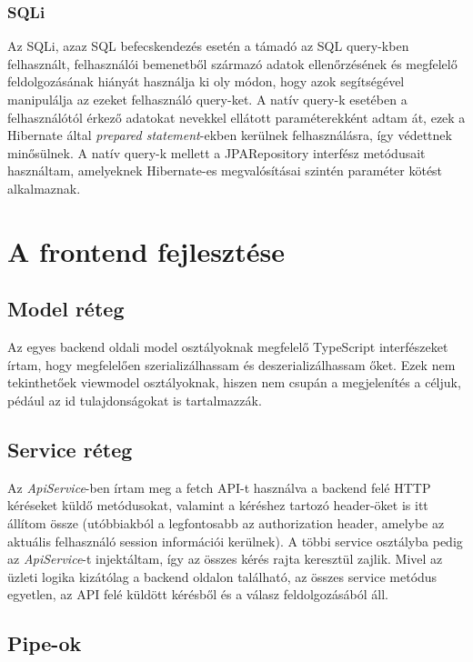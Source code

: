 \documentclass[a4paper,12pt]{report}
\theoremstyle{definition}
\theoremstyle{remark}
\begin{document}
	\subsection{SQLi}

Az SQLi\cite{Infbiztwebsite2}, azaz SQL befecskendezés esetén a támadó az SQL query-kben felhasznált, felhasználói bemenetből származó adatok ellenőrzésének és megfelelő feldolgozásának hiányát használja ki oly módon, hogy azok segítségével manipulálja az ezeket felhasználó query-ket. A natív query-k esetében a felhasználótól érkező adatokat nevekkel ellátott paraméterekként adtam át, ezek a Hibernate által  \textit{prepared statement}-ekben kerülnek felhasználásra, így védettnek minősülnek\cite{hibernatewebsite2}. A natív query-k mellett a JPARepository interfész metódusait használtam, amelyeknek Hibernate-es megvalósításai szintén paraméter kötést alkalmaznak.

\chapter{A frontend fejlesztése}

\section{Model réteg}

Az egyes backend oldali model osztályoknak megfelelő TypeScript interfészeket írtam, hogy megfelelően szerializálhassam és deszerializálhassam őket. Ezek nem tekinthetőek viewmodel\cite{Viewmodelwebsite} osztályoknak, hiszen nem csupán a megjelenítés a céljuk, pédául az id tulajdonságokat is tartalmazzák.

\section{Service réteg}

Az \textit{ApiService}-ben írtam meg a fetch API-t\cite{Fetchwebsite} használva a backend felé HTTP kéréseket küldő metódusokat, valamint a kéréshez tartozó header-öket is itt állítom össze (utóbbiakból a legfontosabb az authorization header, amelybe az aktuális felhasználó session információi kerülnek). A többi service osztályba pedig az \textit{ApiService}-t injektáltam, így az összes kérés rajta keresztül zajlik.  Mivel az üzleti logika kizátólag a backend oldalon található, az összes service metódus egyetlen, az API felé küldött kérésből és a válasz feldolgozásából áll.

\section{Pipe-ok}
\end{document}
